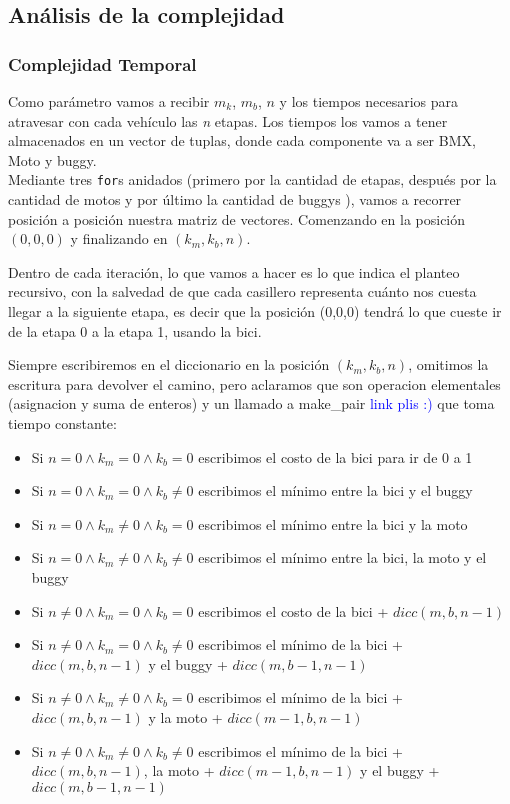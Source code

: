 \newpage

\subsection{An\'alisis de la complejidad}
\subsubsection{Complejidad Temporal}

Como par\'ametro vamos a recibir $m_k$, $m_b$, $n$ y los tiempos necesarios para atravesar con cada veh\'iculo las \emph{n} etapas. Los tiempos los vamos a tener almacenados en un vector de tuplas, donde cada componente va a ser BMX, Moto y buggy.\\

Mediante tres \texttt{for}s anidados (primero por la cantidad de etapas, despu\'es por la cantidad de motos y por \'ultimo la cantidad de buggys ), vamos a recorrer posici\'on a posici\'on nuestra matriz de vectores. Comenzando en la posici\'on $(0,0,0)$ y finalizando en  $(k_{m},k_{b},n)$.

Dentro de cada iteraci\'on, lo que vamos a hacer es lo que indica el planteo recursivo, con la salvedad de que cada casillero representa cu\'anto nos cuesta llegar a la siguiente etapa, es decir que la posici\'on (0,0,0) tendr\'a lo que cueste ir de la etapa 0 a la etapa 1, usando la bici.

Siempre escribiremos en el diccionario en la posici\'on $(k{_m}, k{_b}, n)$, omitimos la escritura para devolver el camino, pero aclaramos que son operacion elementales (asignacion y suma de enteros) y un llamado a make_pair \textcolor{blue}{link plis :)} que toma tiempo constante:

\begin{itemize}
\item Si $n=0 \wedge k_m=0 \wedge k_b=0$ escribimos el costo de la bici para ir de 0 a 1
\item Si $n=0 \wedge k_m=0 \wedge k_b\neq0$ escribimos el m\'inimo entre la bici y el buggy
\item Si $n=0 \wedge k_m\neq0 \wedge k_b=0$ escribimos el m\'inimo entre la bici y la moto
\item Si $n=0 \wedge k_m\neq0 \wedge k_b\neq0$ escribimos el m\'inimo entre la bici, la moto y el buggy
\item Si $n\neq0 \wedge k_m=0 \wedge k_b=0$ escribimos el costo de la bici + $dicc(m, b, n-1)$
\item Si $n\neq0 \wedge k_m=0 \wedge k_b\neq0$ escribimos el m\'inimo de la bici + $dicc(m, b, n-1)$ y el buggy + $dicc(m, b-1, n-1)$
\item Si $n\neq0 \wedge k_m\neq0 \wedge k_b=0$ escribimos el m\'inimo de la bici + $dicc(m, b, n-1)$ y la moto + $dicc(m-1, b, n-1)$
\item Si $n\neq0 \wedge k_m\neq0 \wedge k_b\neq0$ escribimos el m\'inimo de la bici + $dicc(m, b, n-1)$, la moto + $dicc(m-1, b, n-1)$ y el buggy + $dicc(m, b-1, n-1)$
\end{itemize}

